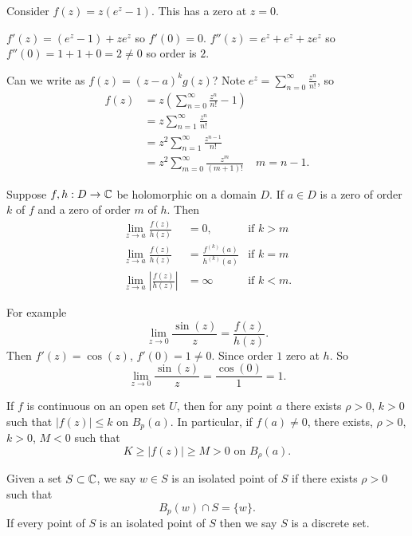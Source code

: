 \documentclass[10pt, a4paper]{article}
\begin{document}
\begin{example}
    Consider $f(z) = z(e ^ z - 1)$.
    This has a zero at $z = 0$.

    $f'(z) = (e ^ z - 1) + ze ^ z$ so $f'(0) = 0$.
    $f''(z) = e ^ z + e ^ z + ze ^ z$ so $f''(0) = 1 + 1 + 0 = 2 \neq 0$ so order is $2$.

    Can we write as $f(z) = (z - a) ^ kg(z)$?
    Note
    $\displaystyle e ^ z = \sum_{n = 0}^{\infty}\frac{z ^ n}{n!}$,
    so
    \begin{align*}
        f(z) &= z\left(\sum_{n = 0}^{\infty}\frac{z ^ n}{n!} - 1\right) \\
        &= z\sum_{n = 1}^{\infty}\frac{z ^ n}{n!} \\
        &= z ^ 2\sum_{n = 1}^{\infty}\frac{z ^ {n - 1}}{n!} \\
        &= z ^ 2\sum_{m = 0}^{\infty}\frac{z ^ m}{(m + 1)!} & m = n - 1.
    \end{align*}
\end{example}

\begin{theorem}
    Suppose $f, h : D \to \mathbb{C}$ be holomorphic on a domain $D$.
    If $a \in D$ is a zero of order $k$ of $f$ and a zero of order $m$ of $h$.
    Then
    \begin{align*}
        \lim_{z \to a}\frac{f(z)}{h(z)} &= 0,&\text{if } k > m \\
        \lim_{z \to a}\frac{f(z)}{h(z)} &= \frac{f ^ {(k)}(a)}{h ^{(k)}(a)} &\text{if } k = m \\
        \lim_{z \to a}\left|\frac{f(z)}{h(z)}\right| &= \infty &\text{if } k < m.
    \end{align*}
\end{theorem}
For example
\[
\lim_{z \to 0}\frac{\sin(z)}{z} = \frac{f(z)}{h(z)}.
\]
Then $f'(z) = \cos(z)$,
$f'(0) = 1 \neq 0$.
Since order $1$ zero at $h$.
So
\[
\lim_{z \to 0}\frac{\sin(z)}{z} = \frac{\cos(0)}{1} = 1.
\]

\begin{lemma}
    If $f$ is continuous on an open set $U$,
    then for any point $a$ there exists $\rho > 0$,
    $k > 0$ such that $|f(z)| \leq k$ on $B_p(a)$.
    In particular,
    if $f(a) \neq 0$,
    there exists,
    $\rho > 0$,
    $k > 0$,
    $M < 0$ such that
    \[
    K \geq |f(z)| \geq M > 0\text{ on }B_{\rho}(a).
    \]
\end{lemma}

\begin{definition}
    Given a set $S \subset \mathbb{C}$,
    we say $w \in S$ is an isolated point of $S$ if there exists $\rho > 0$ such that
    \[
    B_p(w) \cap S = \{w\}.
    \]
    If every point of $S$ is an isolated point of $S$ then we say $S$ is a discrete set.
\end{definition}
\end{document}
